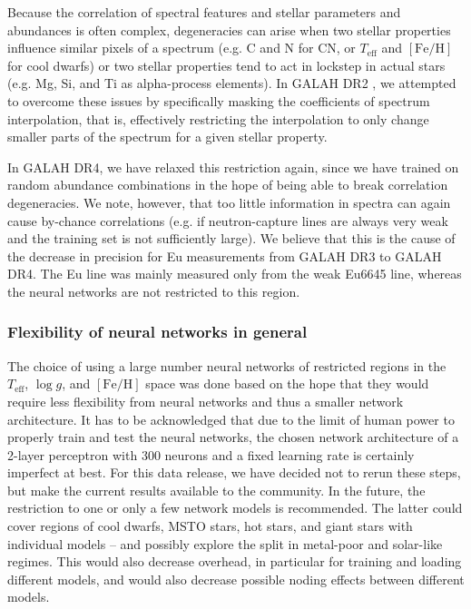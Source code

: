 \documentclass[
  journal=pasa,
  manuscript=research-paper, %
  year=2024,
  volume=37
]{cup-journal}
\newcommand{\Teff}{$T_\mathrm{eff}$\xspace}
\newcommand{\logg}{$\log g$\xspace}
\newcommand{\feh}{$\mathrm{[Fe/H]}$\xspace}
\newcommand{\TLF}{\Teff, \logg, and \feh}
\begin{document}
Because the correlation of spectral features and stellar parameters and abundances is often complex, degeneracies can arise when two stellar properties influence similar pixels of a spectrum (e.g. C and N for CN, or \Teff and \feh for cool dwarfs) or two stellar properties tend to act in lockstep in actual stars (e.g. Mg, Si, and Ti as alpha-process elements). In GALAH DR2 \citep{Buder2018}, we attempted to overcome these issues by specifically masking the coefficients of spectrum interpolation, that is, effectively restricting the interpolation to only change smaller parts of the spectrum for a given stellar property.

In GALAH DR4, we have relaxed this restriction again, since we have trained on random abundance combinations in the hope of being able to break correlation degeneracies. We note, however, that too little information in spectra can again cause by-chance correlations (e.g. if neutron-capture lines are always very weak and the training set is not sufficiently large). We believe that this is the cause of the decrease in precision for Eu measurements from GALAH DR3 to GALAH DR4. The Eu line was mainly measured only from the weak Eu6645 line, whereas the neural networks are not restricted to this region.

\subsubsection{Flexibility of neural networks in general}

The choice of using a large number neural networks of restricted regions in the \TLF space was done based on the hope that they would require less flexibility from neural networks and thus a smaller network architecture. It has to be acknowledged that due to the limit of human power to properly train and test the neural networks, the chosen network architecture of a 2-layer perceptron with 300 neurons and a fixed learning rate is certainly imperfect at best. For this data release, we have decided not to rerun these steps, but make the current results available to the community. In the future, the restriction to one or only a few network models is recommended. The latter could cover regions of cool dwarfs, MSTO stars, hot stars, and giant stars with individual models -- and possibly explore the split in metal-poor and solar-like regimes. This would also decrease overhead, in particular for training and loading different models, and would also decrease possible noding effects between different models.
\end{document}
